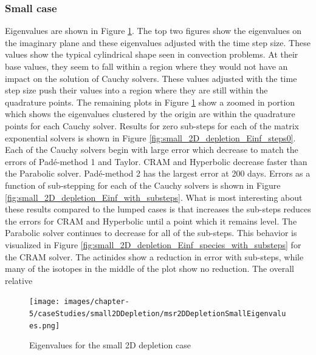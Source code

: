 \subsubsection{Small case}
Eigenvalues are shown in Figure \ref{fig:small_2D_depletion_eigenvalues}. The top two figures show the eigenvalues on the imaginary plane and these eigenvalues adjusted with the time step size. These values show the typical cylindrical shape seen in convection problems. At their base values, they seem to fall within a region where they would not have an impact on the solution of Cauchy solvers. These values adjusted with the time step size push their values into a region where they are still within the quadrature points. The remaining plots in Figure \ref{fig:small_2D_depletion_eigenvalues} show a zoomed in portion which shows the eigenvalues clustered by the origin are within the quadrature points for each Cauchy solver. Results for zero sub-steps for each of the matrix exponential solvers is shown in Figure \ref{fig:small_2D_depletion_Einf_steps0}. Each of the Cauchy solvers begin with large error which decrease to match the errors of Pad\'e-method 1 and Taylor. CRAM and Hyperbolic decrease faster than the Parabolic solver. Pad\'e-method 2 has the largest error at 200 days. Errors as a function of sub-stepping for each of the Cauchy solvers is shown in Figure \ref{fig:small_2D_depletion_Einf_with_substeps}. What is most interesting about these results compared to the lumped cases is that increases the sub-steps reduces the errors for CRAM and Hyperbolic until a point which it remains level. The Parabolic solver continues to decrease for all of the sub-steps. This behavior is visualized in Figure \ref{fig:small_2D_depletion_Einf_species_with_substeps} for the CRAM solver. The actinides show a reduction in error with sub-steps, while many of the isotopes in the middle of the plot show no reduction. The overall relative 

\clearpage

\begin{figure}[p]
    \centering
    \texttt{[image: images/chapter-5/caseStudies/small2DDepletion/msr2DDepletionSmallEigenvalues.png]}
    \caption{Eigenvalues for the small 2D depletion case}
    \label{fig:small_2D_depletion_eigenvalues}
\end{figure}

\clearpage

